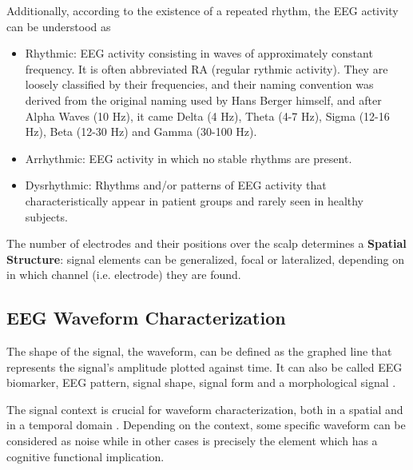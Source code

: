 \documentclass[brainsci,article,submit,moreauthors,pdftex,10pt,a4paper]{mdpi}
\begin{document}
\noindent Additionally, according to the existence of a repeated rhythm, the EEG activity can be understood as

\begin{itemize}
\item Rhythmic: EEG activity consisting in waves of approximately constant frequency.  It is often abbreviated RA (regular rythmic activity). They are loosely classified by their frequencies, and their naming convention was derived from the original naming used by Hans Berger himself, and after Alpha Waves (10 Hz), it came Delta (4 Hz), Theta (4-7 Hz), Sigma (12-16 Hz), Beta (12-30 Hz) and Gamma (30-100 Hz).  
\item Arrhythmic: EEG activity in which no stable rhythms are present.  
\item Dysrhythmic: Rhythms and/or patterns of EEG activity that characteristically appear in patient groups and rarely seen in healthy subjects.
\end{itemize}

The number of electrodes and their positions over the scalp determines a \textbf{Spatial Structure}: signal elements can be generalized, focal or lateralized, depending on in which channel (i.e. electrode) they are found.



\subsection{EEG Waveform Characterization}

The shape of the signal, the waveform, can be defined as the graphed line that represents the signal's amplitude plotted against time. It can also be called EEG biomarker,  EEG pattern, signal shape, signal form and a morphological signal \citep{Jansen1991}.

The signal context is crucial for waveform characterization, both in a spatial and in a temporal domain \citep{Jansen1991}.  Depending on the context, some specific waveform can be considered as noise while in other cases is precisely the element which has a cognitive functional implication.



%
\end{document}
